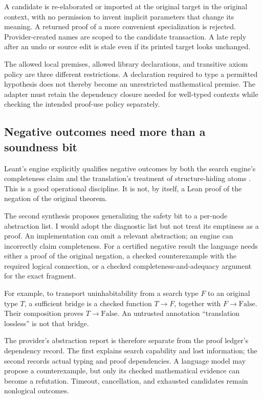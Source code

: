 \documentclass[11pt,letterpaper]{article}
\theoremstyle{definition}
\begin{document}
A candidate is re-elaborated or imported at the original target in the original
context, with no permission to invent implicit parameters that change its meaning.
A returned proof of a more convenient specialization is rejected. Provider-created
names are scoped to the candidate transaction. A late reply after an undo or source
edit is stale even if its printed target looks unchanged.

The allowed local premises, allowed library declarations, and transitive axiom
policy are three different restrictions. A declaration required to type a permitted
hypothesis does not thereby become an unrestricted mathematical premise. The
adapter must retain the dependency closure needed for well-typed contexts while
checking the intended proof-use policy separately.

\subsection{Negative outcomes need more than a soundness bit}
Leant's engine explicitly qualifies negative outcomes by both the search engine's
completeness claim and the translation's treatment of structure-hiding atoms
\cite{lengine}. This is a good operational discipline. It is not, by itself, a Lean
proof of the negation of the original theorem.

The second synthesis proposes generalizing the safety bit to a per-node abstraction
list\cite{review}. I would adopt the diagnostic list but not treat its emptiness
as a proof. An implementation can omit a relevant abstraction; an engine can
incorrectly claim completeness. For a certified negative result the language needs
either a proof of the original negation, a checked counterexample with the required
logical connection, or a checked completeness-and-adequacy argument for the exact
fragment.

For example, to transport uninhabitability from a search type \(F\) to an original
type \(T\), a sufficient bridge is a checked function \(T\to F\), together with
\(F\to\mathrm{False}\). Their composition proves \(T\to\mathrm{False}\).
An untrusted annotation ``translation lossless'' is not that bridge.

The provider's abstraction report is therefore separate from the proof ledger's
dependency record. The first explains search capability and lost information;
the second records actual typing and proof dependencies. A language model may
propose a counterexample, but only its checked mathematical evidence can become
a refutation. Timeout, cancellation, and exhausted candidates remain nonlogical
outcomes.
\end{document}
